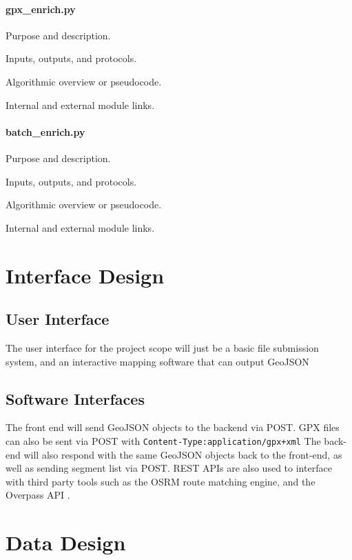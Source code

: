 \documentclass[11pt,twoside]{report}
\begin{document}
\paragraph{gpx\_enrich.py}
\begin{description}
	\small
	\item[Name:] Purpose and description.
	\item[Interfaces:] Inputs, outputs, and protocols.
	\item[Behavior:] Algorithmic overview or pseudocode.
	\item[Dependencies:] Internal and external module links.
\end{description}
\paragraph{batch\_enrich.py}
\begin{description}
	\small
	\item[Name:] Purpose and description.
	\item[Interfaces:] Inputs, outputs, and protocols.
	\item[Behavior:] Algorithmic overview or pseudocode.
	\item[Dependencies:] Internal and external module links.
\end{description}

\section{Interface Design}
\subsection{User Interface}
The user interface for the project scope will just be a basic file submission system, and an interactive mapping software that can output GeoJSON
\subsection{Software Interfaces}
The front end will send GeoJSON objects to the backend via POST. GPX files can also be sent via POST with \texttt{\small Content-Type:application/gpx+xml}
The back-end will also respond with the same GeoJSON objects back to the front-end, as well as sending segment list via POST.
REST APIs are also used to interface with third party tools such as the OSRM \citep{Luxen2011} route matching engine, and the Overpass API \citep{OverpassAPI}.

\section{Data Design}
\end{document}
